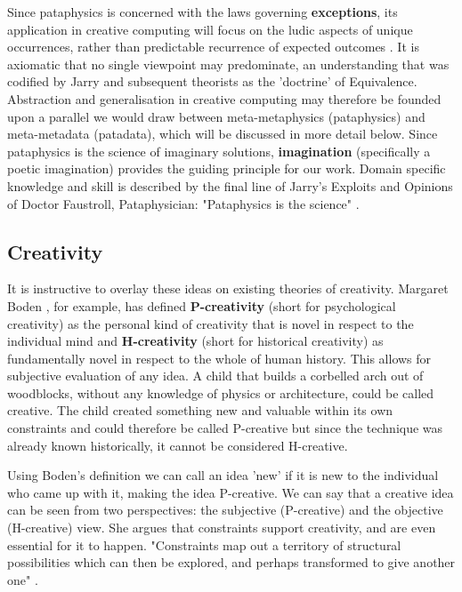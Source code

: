 Since pataphysics is concerned with the laws governing \textbf{exceptions}, its application in creative computing will focus on the ludic aspects of unique occurrences, rather than predictable recurrence of expected outcomes \citep{Bok2002}. It is axiomatic that no single viewpoint may predominate, an understanding that was codified by Jarry and subsequent theorists as the 'doctrine' of Equivalence. Abstraction and generalisation in creative computing may therefore be founded upon a parallel we would draw between meta-metaphysics (pataphysics) and meta-metadata (patadata), which will be discussed in more detail below. Since pataphysics is the science of imaginary solutions, \textbf{imagination} (specifically a poetic imagination) provides the guiding principle for our work. Domain specific knowledge and skill is described by the final line of Jarry's Exploits and Opinions of Doctor Faustroll, Pataphysician: "Pataphysics is the science" \citep[p.114]{Jarry1996}.

\subsection{Creativity}

It is instructive to overlay these ideas on existing theories of creativity. Margaret Boden \citep{Boden2003}, for example, has defined \textbf{P-creativity} (short for psychological creativity) as the personal kind of creativity that is novel in respect to the individual mind and \textbf{H-creativity} (short for historical creativity) as fundamentally novel in respect to the whole of human history. This allows for subjective evaluation of any idea. A child that builds a corbelled arch out of woodblocks, without any knowledge of physics or architecture, could be called creative. The child created something new and valuable within its own constraints and could therefore be called P-creative but since the technique was already known historically, it cannot be considered H-creative.

Using Boden's definition we can call an idea 'new' if it is new to the individual who came up with it, making the idea P-creative. We can say that a creative idea can be seen from two perspectives: the subjective (P-creative) and the objective (H-creative) view. She argues that constraints support creativity, and are even essential for it to happen.  "Constraints map out a territory of structural possibilities which can then be explored, and perhaps transformed to give another one" \citep[p.82]{Boden2003}.

